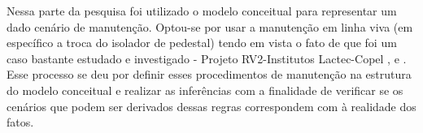 Nessa parte da pesquisa foi utilizado o modelo conceitual para representar um dado cenário de manutenção. Optou-se por usar a manutenção em linha viva (em específico a troca do isolador de pedestal) tendo em vista o fato de que foi um caso bastante estudado e investigado - Projeto RV2-Institutos Lactec-Copel \cite{wesaac}, \cite{programa} e \cite{Gruber2018UsingGE}. Esse processo se deu por definir esses procedimentos de manutenção na estrutura do modelo conceitual e realizar as inferências com a finalidade de verificar se os cenários que podem ser derivados dessas regras correspondem com à realidade dos fatos. 